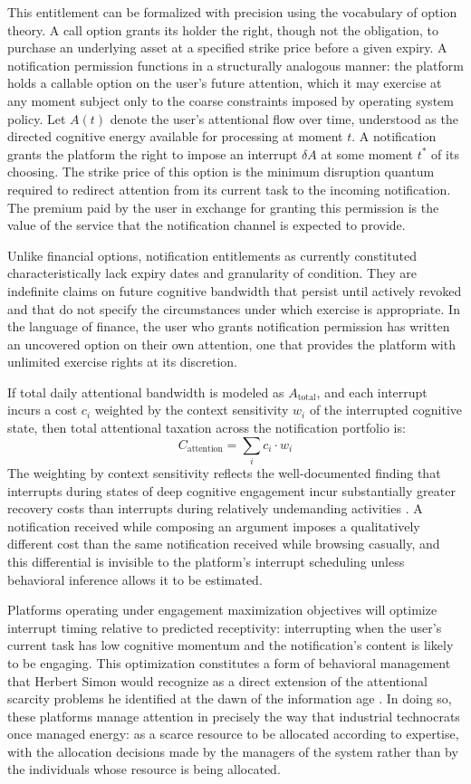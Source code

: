 \documentclass[12pt]{article}
\begin{document}
This entitlement can be formalized with precision using the vocabulary of option theory. A call option grants its holder the right, though not the obligation, to purchase an underlying asset at a specified strike price before a given expiry. A notification permission functions in a structurally analogous manner: the platform holds a callable option on the user's future attention, which it may exercise at any moment subject only to the coarse constraints imposed by operating system policy. Let $A(t)$ denote the user's attentional flow over time, understood as the directed cognitive energy available for processing at moment $t$. A notification grants the platform the right to impose an interrupt $\delta A$ at some moment $t^*$ of its choosing. The strike price of this option is the minimum disruption quantum required to redirect attention from its current task to the incoming notification. The premium paid by the user in exchange for granting this permission is the value of the service that the notification channel is expected to provide.

Unlike financial options, notification entitlements as currently constituted characteristically lack expiry dates and granularity of condition. They are indefinite claims on future cognitive bandwidth that persist until actively revoked and that do not specify the circumstances under which exercise is appropriate. In the language of finance, the user who grants notification permission has written an uncovered option on their own attention, one that provides the platform with unlimited exercise rights at its discretion.

If total daily attentional bandwidth is modeled as $A_{\text{total}}$, and each interrupt incurs a cost $c_i$ weighted by the context sensitivity $w_i$ of the interrupted cognitive state, then total attentional taxation across the notification portfolio is:
\[
C_{\text{attention}} = \sum_i c_i \cdot w_i
\]
The weighting by context sensitivity reflects the well-documented finding that interrupts during states of deep cognitive engagement incur substantially greater recovery costs than interrupts during relatively undemanding activities \citep{Wolf2018}. A notification received while composing an argument imposes a qualitatively different cost than the same notification received while browsing casually, and this differential is invisible to the platform's interrupt scheduling unless behavioral inference allows it to be estimated.

Platforms operating under engagement maximization objectives will optimize interrupt timing relative to predicted receptivity: interrupting when the user's current task has low cognitive momentum and the notification's content is likely to be engaging. This optimization constitutes a form of behavioral management that Herbert Simon would recognize as a direct extension of the attentional scarcity problems he identified at the dawn of the information age \citep{Simon1971}. In doing so, these platforms manage attention in precisely the way that industrial technocrats once managed energy: as a scarce resource to be allocated according to expertise, with the allocation decisions made by the managers of the system rather than by the individuals whose resource is being allocated.
\end{document}
